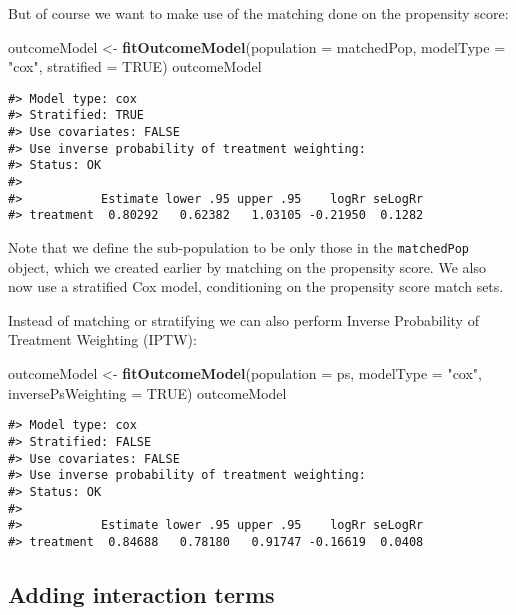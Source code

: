 \documentclass[]{article}
\newenvironment{Shaded}{\begin{snugshade}}{\end{snugshade}}
\newcommand{\DataTypeTok}[1]{\textcolor[rgb]{0.13,0.29,0.53}{#1}}
\newcommand{\KeywordTok}[1]{\textcolor[rgb]{0.13,0.29,0.53}{\textbf{#1}}}
\newcommand{\NormalTok}[1]{#1}
\newcommand{\OtherTok}[1]{\textcolor[rgb]{0.56,0.35,0.01}{#1}}
\newcommand{\StringTok}[1]{\textcolor[rgb]{0.31,0.60,0.02}{#1}}
\begin{document}
But of course we want to make use of the matching done on the propensity
score:

\begin{Shaded}
\begin{Highlighting}[]
\NormalTok{outcomeModel <-}\StringTok{ }\KeywordTok{fitOutcomeModel}\NormalTok{(}\DataTypeTok{population =}\NormalTok{ matchedPop,}
                                \DataTypeTok{modelType =} \StringTok{"cox"}\NormalTok{,}
                                \DataTypeTok{stratified =} \OtherTok{TRUE}\NormalTok{)}
\NormalTok{outcomeModel}
\end{Highlighting}
\end{Shaded}

\begin{verbatim}
#> Model type: cox
#> Stratified: TRUE
#> Use covariates: FALSE
#> Use inverse probability of treatment weighting: 
#> Status: OK
#> 
#>           Estimate lower .95 upper .95    logRr seLogRr
#> treatment  0.80292   0.62382   1.03105 -0.21950  0.1282
\end{verbatim}

Note that we define the sub-population to be only those in the
\texttt{matchedPop} object, which we created earlier by matching on the
propensity score. We also now use a stratified Cox model, conditioning
on the propensity score match sets.

Instead of matching or stratifying we can also perform Inverse
Probability of Treatment Weighting (IPTW):

\begin{Shaded}
\begin{Highlighting}[]
\NormalTok{outcomeModel <-}\StringTok{ }\KeywordTok{fitOutcomeModel}\NormalTok{(}\DataTypeTok{population =}\NormalTok{ ps,}
                                \DataTypeTok{modelType =} \StringTok{"cox"}\NormalTok{,}
                                \DataTypeTok{inversePsWeighting =} \OtherTok{TRUE}\NormalTok{)}
\NormalTok{outcomeModel}
\end{Highlighting}
\end{Shaded}

\begin{verbatim}
#> Model type: cox
#> Stratified: FALSE
#> Use covariates: FALSE
#> Use inverse probability of treatment weighting: 
#> Status: OK
#> 
#>           Estimate lower .95 upper .95    logRr seLogRr
#> treatment  0.84688   0.78180   0.91747 -0.16619  0.0408
\end{verbatim}

\hypertarget{adding-interaction-terms}{%
\subsection{Adding interaction terms}\label{adding-interaction-terms}}
\end{document}
